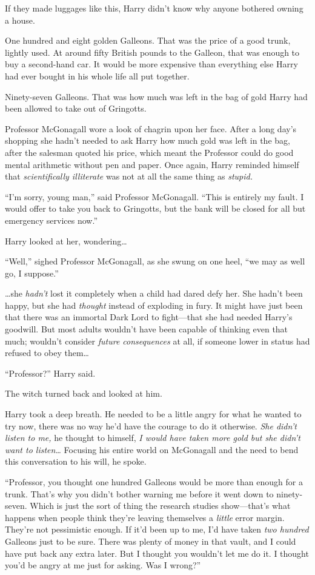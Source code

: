 If they made luggages like this, Harry didn't know why anyone bothered
owning a house.

One hundred and eight golden Galleons. That was the price of a good
trunk, lightly used. At around fifty British pounds to the Galleon, that
was enough to buy a second-hand car. It would be more expensive than
everything else Harry had ever bought in his whole life all put
together.

Ninety-seven Galleons. That was how much was left in the bag of gold
Harry had been allowed to take out of Gringotts.

Professor McGonagall wore a look of chagrin upon her face. After a long
day's shopping she hadn't needed to ask Harry how much gold was left in
the bag, after the salesman quoted his price, which meant the Professor
could do good mental arithmetic without pen and paper. Once again, Harry
reminded himself that \emph{scientifically illiterate} was not at all
the same thing as \emph{stupid.}

``I'm sorry, young man,'' said Professor McGonagall. ``This is entirely
my fault. I would offer to take you back to Gringotts, but the bank will
be closed for all but emergency services now.''

Harry looked at her, wondering\ldots{}

``Well,'' sighed Professor McGonagall, as she swung on one heel, ``we
may as well go, I suppose.''

\ldots{}she \emph{hadn't} lost it completely when a child had dared defy
her. She hadn't been happy, but she had \emph{thought} instead of
exploding in fury. It might have just been that there was an immortal
Dark Lord to fight---that she had needed Harry's goodwill. But most
adults wouldn't have been capable of thinking even that much; wouldn't
consider \emph{future consequences} at all, if someone lower in status
had refused to obey them\ldots{}

``Professor?'' Harry said.

The witch turned back and looked at him.

Harry took a deep breath. He needed to be a little angry for what he
wanted to try now, there was no way he'd have the courage to do it
otherwise. \emph{She didn't listen to me,} he thought to himself,
\emph{I would have taken more gold but she didn't want to
listen\ldots{}} Focusing his entire world on McGonagall and the need to
bend this conversation to his will, he spoke.

``Professor, you thought one hundred Galleons would be more than enough
for a trunk. That's why you didn't bother warning me before it went down
to ninety-seven. Which is just the sort of thing the research studies
show---that's what happens when people think they're leaving themselves
a \emph{little} error margin. They're not pessimistic enough. If it'd
been up to me, I'd have taken \emph{two hundred} Galleons just to be
sure. There was plenty of money in that vault, and I could have put back
any extra later. But I thought you wouldn't let me do it. I thought
you'd be angry at me just for asking. Was I wrong?''

